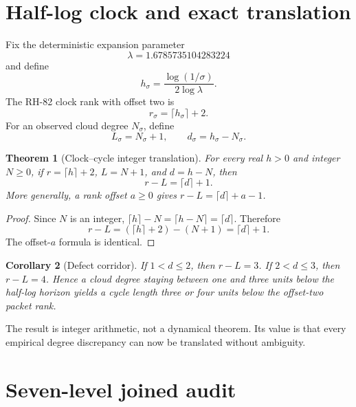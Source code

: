 \documentclass[12pt]{article}
\newtheorem{theorem}{Theorem}[section]
\newtheorem{corollary}[theorem]{Corollary}
\theoremstyle{remark}
\begin{document}
\section{Half-log clock and exact translation}

Fix the deterministic expansion parameter
\[
 \lambda=1.6785735104283224
\]
and define
\begin{equation}\label{eq:h}
 h_\sigma=\frac{\log(1/\sigma)}{2\log\lambda}.
\end{equation}
The RH-82 clock rank with offset two is
\begin{equation}\label{eq:r}
 r_\sigma=\lceil h_\sigma\rceil+2.
\end{equation}
For an observed cloud degree $N_\sigma$, define
\begin{equation}\label{eq:Ld}
 L_\sigma=N_\sigma+1,
 \qquad
 d_\sigma=h_\sigma-N_\sigma.
\end{equation}

\begin{theorem}[Clock--cycle integer translation]\label{thm:translation}
For every real $h>0$ and integer $N\ge0$, if
$r=\lceil h\rceil+2$, $L=N+1$, and $d=h-N$, then
\begin{equation}\label{eq:translation}
 r-L=\lceil d\rceil+1.
\end{equation}
More generally, a rank offset $a\ge0$ gives
$r-L=\lceil d\rceil+a-1$.
\end{theorem}

\begin{proof}
Since $N$ is an integer,
$\lceil h\rceil-N=\lceil h-N\rceil=\lceil d\rceil$.  Therefore
\[
 r-L=(\lceil h\rceil+2)-(N+1)
 =\lceil d\rceil+1.
\]
The offset-$a$ formula is identical.
\end{proof}

\begin{corollary}[Defect corridor]
If $1<d\le2$, then $r-L=3$.  If $2<d\le3$, then $r-L=4$.  Hence a cloud
degree staying between one and three units below the half-log horizon yields
a cycle length three or four units below the offset-two packet rank.
\end{corollary}

The result is integer arithmetic, not a dynamical theorem.  Its value is that
every empirical degree discrepancy can now be translated without ambiguity.

\section{Seven-level joined audit}
\end{document}
